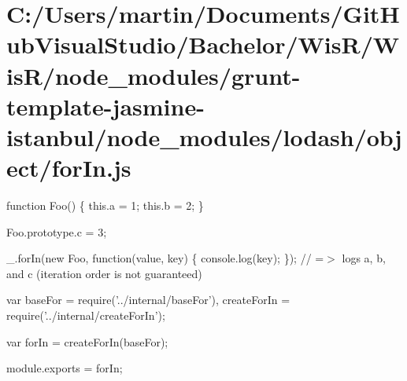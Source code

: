 \hypertarget{_c_1_2_users_2martin_2_documents_2_git_hub_visual_studio_2_bachelor_2_wis_r_2_wis_r_2node_module42c7a267d83f1620fe9c4f3f4362a4f0}{}\section{C\+:/\+Users/martin/\+Documents/\+Git\+Hub\+Visual\+Studio/\+Bachelor/\+Wis\+R/\+Wis\+R/node\+\_\+modules/grunt-\/template-\/jasmine-\/istanbul/node\+\_\+modules/lodash/object/for\+In.\+js}
function Foo() \{ this.\+a = 1; this.\+b = 2; \}

Foo.\+prototype.\+c = 3;

\+\_\+.\+for\+In(new Foo, function(value, key) \{ console.\+log(key); \}); // =$>$ logs \textquotesingle{}a\textquotesingle{}, \textquotesingle{}b\textquotesingle{}, and \textquotesingle{}c\textquotesingle{} (iteration order is not guaranteed)


\begin{DoxyCodeInclude}
var baseFor = require(\textcolor{stringliteral}{'../internal/baseFor'}),
    createForIn = require(\textcolor{stringliteral}{'../internal/createForIn'});

var forIn = createForIn(baseFor);

module.exports = forIn;
\end{DoxyCodeInclude}
 